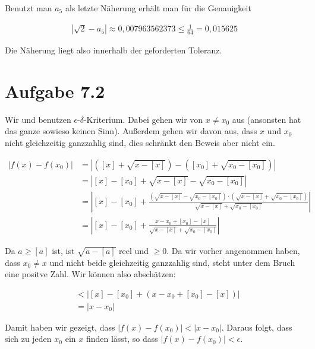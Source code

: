 \documentclass[a4paper,german,12pt,smallheadings]{scrartcl}
\begin{document}
Benutzt man $a_5$ als letzte Näherung erhält man für die Genauigkeit

\begin{align*}
  |\sqrt{2} - a_5| \approx 0{,}007963562373 \le \frac{1}{64} = 0{,}015625
\end{align*}

Die Näherung liegt also innerhalb der geforderten Toleranz.

\section{Aufgabe 7.2}

Wir und benutzen $\epsilon$-$\delta$-Kriterium. Dabei gehen wir von $x \neq
x_0$ aus (ansonsten hat das ganze sowieso keinen Sinn). Außerdem gehen wir
davon aus, dass $x$ und $x_0$ nicht gleichzeitig ganzzahlig sind, dies schränkt
den Beweis aber nicht ein.

\begin{align*}
  |f(x) - f(x_0)| &= \left|([x] + \sqrt{x-[x]}) - ([x_0] + \sqrt{x_0 - [x_0]})\right| \\
                  &= \left|[x] - [x_0] + \sqrt{x-[x]} - \sqrt{x_0 - [x_0]}\right| \\
                  &= \left|[x] - [x_0] + \frac{(\sqrt{x-[x]} - \sqrt{x_0 - [x_0]}) \cdot (\sqrt{x-[x]} + \sqrt{x_0 - [x_0]})}{\sqrt{x-[x]} + \sqrt{x_0 - [x_0]}}\right| \\
                  &= \left|[x] - [x_0] + \frac{x-x_0+[x_0]-[x]}{\sqrt{x-[x]} + \sqrt{x_0 - [x_0]}}\right|
\end{align*}

Da $a \ge [a]$ ist, ist $\sqrt{a - [a]}$ reel und $\ge 0$. Da wir vorher
angenommen haben, dass $x_0 \neq x$ und nicht beide gleichzeitig ganzzahlig
sind, steht unter dem Bruch eine positve Zahl. Wir können also abschätzen:

\begin{align*}
  &< \left|[x] - [x_0] + (x-x_0+[x_0]-[x])\right| \\
  &= \left|x-x_0\right|
\end{align*}

Damit haben wir gezeigt, dass $|f(x) - f(x_0)| < |x-x_0|$. Daraus folgt, dass sich
zu jeden $x_0$ ein $x$ finden lässt, so dass $|f(x) - f(x_0)| < \epsilon$.
\end{document}
